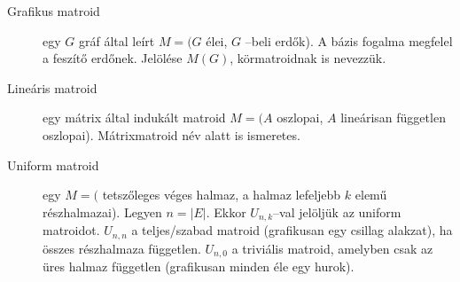 \begin{description}
	\item[Grafikus matroid] egy $G$ gráf által leírt $M=(G$ élei, $G$ --beli erdők). A bázis fogalma
	      megfelel a feszítő erdőnek. Jelölése $M(G)$, körmatroidnak is nevezzük.
	\item[Lineáris matroid] egy mátrix által indukált matroid $M=(A$ oszlopai, $A$ lineárisan
	      független oszlopai). Mátrixmatroid név alatt is ismeretes.
	\item[Uniform matroid] egy $M=($ tetszőleges véges halmaz, a halmaz lefeljebb
	      $k$ elemű részhalmazai). Legyen $n=|E|$. Ekkor $U_{n,k}$--val jelöljük az
	      uniform matroidot. $U_{n,n}$ a teljes/szabad matroid (grafikusan egy csillag
	      alakzat), ha összes részhalmaza független. $U_{n,0}$ a triviális matroid,
	      amelyben csak az üres halmaz független (grafikusan minden éle egy hurok).
\end{description}


